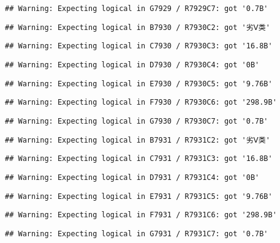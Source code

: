 \documentclass[
]{article}
\begin{document}
\begin{verbatim}
## Warning: Expecting logical in G7929 / R7929C7: got '0.7B'
\end{verbatim}

\begin{verbatim}
## Warning: Expecting logical in B7930 / R7930C2: got '劣Ⅴ类'
\end{verbatim}

\begin{verbatim}
## Warning: Expecting logical in C7930 / R7930C3: got '16.8B'
\end{verbatim}

\begin{verbatim}
## Warning: Expecting logical in D7930 / R7930C4: got '0B'
\end{verbatim}

\begin{verbatim}
## Warning: Expecting logical in E7930 / R7930C5: got '9.76B'
\end{verbatim}

\begin{verbatim}
## Warning: Expecting logical in F7930 / R7930C6: got '298.9B'
\end{verbatim}

\begin{verbatim}
## Warning: Expecting logical in G7930 / R7930C7: got '0.7B'
\end{verbatim}

\begin{verbatim}
## Warning: Expecting logical in B7931 / R7931C2: got '劣Ⅴ类'
\end{verbatim}

\begin{verbatim}
## Warning: Expecting logical in C7931 / R7931C3: got '16.8B'
\end{verbatim}

\begin{verbatim}
## Warning: Expecting logical in D7931 / R7931C4: got '0B'
\end{verbatim}

\begin{verbatim}
## Warning: Expecting logical in E7931 / R7931C5: got '9.76B'
\end{verbatim}

\begin{verbatim}
## Warning: Expecting logical in F7931 / R7931C6: got '298.9B'
\end{verbatim}

\begin{verbatim}
## Warning: Expecting logical in G7931 / R7931C7: got '0.7B'
\end{verbatim}
\end{document}
